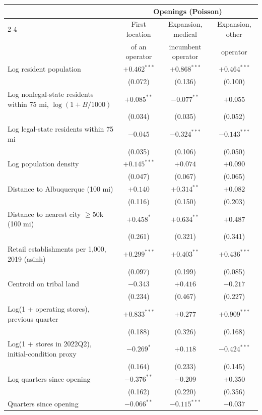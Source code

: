 \begin{tabular}{@{}lccc@{}}
\toprule
 & \multicolumn{3}{c}{Openings (Poisson)} \\
\cmidrule(lr){2-4}
 & First location & Expansion, medical & Expansion, other \\
 & of an operator & incumbent operator & operator \\
\midrule
Log resident population & $+0.462^{***}$ & $+0.868^{***}$ & $+0.464^{***}$ \\
 & (0.072) & (0.136) & (0.100) \\
Log nonlegal-state residents within 75 mi, $\log(1+B/1000)$ & $+0.085^{**}$ & $-0.077^{**}$ & $+0.055$ \\
 & (0.034) & (0.035) & (0.052) \\
Log legal-state residents within 75 mi & $-0.045$ & $-0.324^{***}$ & $-0.143^{***}$ \\
 & (0.035) & (0.106) & (0.050) \\
Log population density & $+0.145^{***}$ & $+0.074$ & $+0.090$ \\
 & (0.047) & (0.067) & (0.065) \\
Distance to Albuquerque (100 mi) & $+0.140$ & $+0.314^{**}$ & $+0.082$ \\
 & (0.116) & (0.150) & (0.203) \\
Distance to nearest city $\geq$50k (100 mi) & $+0.458^{*}$ & $+0.634^{**}$ & $+0.487$ \\
 & (0.261) & (0.321) & (0.341) \\
Retail establishments per 1,000, 2019 (asinh) & $+0.299^{***}$ & $+0.403^{**}$ & $+0.436^{***}$ \\
 & (0.097) & (0.199) & (0.085) \\
Centroid on tribal land & $-0.343$ & $+0.416$ & $-0.217$ \\
 & (0.234) & (0.467) & (0.227) \\
Log(1 + operating stores), previous quarter & $+0.833^{***}$ & $+0.277$ & $+0.909^{***}$ \\
 & (0.188) & (0.326) & (0.168) \\
Log(1 + stores in 2022Q2), initial-condition proxy & $-0.269^{*}$ & $+0.118$ & $-0.424^{***}$ \\
 & (0.164) & (0.233) & (0.145) \\
Log quarters since opening & $-0.376^{**}$ & $-0.209$ & $+0.350$ \\
 & (0.162) & (0.220) & (0.356) \\
Quarters since opening & $-0.066^{**}$ & $-0.115^{***}$ & $-0.037$ \\

\end{tabular}
